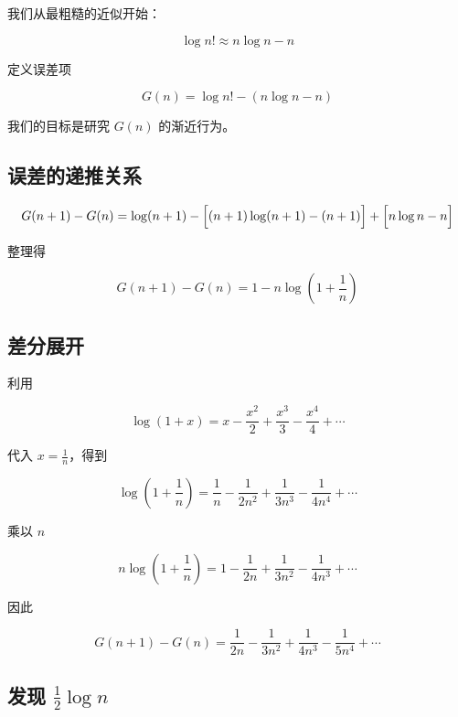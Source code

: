 \documentclass[11pt]{article}%
\begin{document}
    我们从最粗糙的近似开始：

    \[
    \log n!
    \approx
    n\log n-n
    \]

    \vspace{1em}
    定义误差项

    \[
    G(n)
    =
    \log n!
    -
    (n\log n-n)
    \]

    \vspace{1em}
    我们的目标是研究 \(G(n)\) 的渐近行为。

    \subsection{误差的递推关系}

    \[
    \begin{aligned}
    G(n+1)-G(n)
    =
    \log(n+1)
    -
    \Bigl[(n+1)\log(n+1)-(n+1)\Bigr]
    +
    \Bigl[n\log n-n\Bigr]
    \end{aligned}
    \]

    \vspace{1em}
    整理得

    \[
    \boxed{
    G(n+1)-G(n)
    =
    1-n\log\!\left(1+\frac1n\right)
    }
    \]

    \subsection{差分展开}

    利用

    \[
    \log(1+x)
    =
    x-\frac{x^2}{2}
    +\frac{x^3}{3}
    -\frac{x^4}{4}
    +\cdots
    \]

    \vspace{1em}
    代入 \(x=\frac1n\)，得到

    \[
    \log\!\left(1+\frac1n\right)
    =
    \frac1n
    -\frac1{2n^2}
    +\frac1{3n^3}
    -\frac1{4n^4}
    +\cdots
    \]

    \vspace{1em}
    乘以 \(n\)

    \[
    n\log\!\left(1+\frac1n\right)
    =
    1-\frac1{2n}
    +\frac1{3n^2}
    -\frac1{4n^3}
    +\cdots
    \]

    \vspace{1em}
    因此

    \[
    \boxed{
    G(n+1)-G(n)
    =
    \frac1{2n}
    -\frac1{3n^2}
    +\frac1{4n^3}
    -\frac1{5n^4}
    +\cdots
    }
    \]

    \subsection{发现 $\frac12\log n$}
\end{document}
